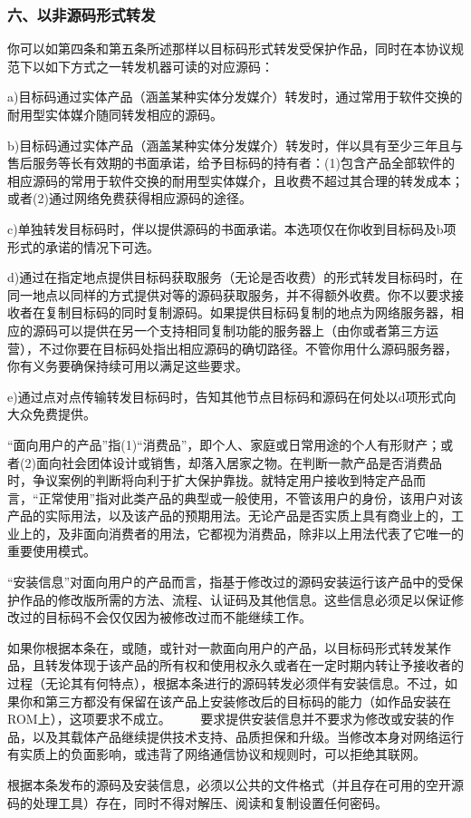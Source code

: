 \subsubsection{六、以非源码形式转发}
你可以如第四条和第五条所述那样以目标码形式转发受保护作品，同时在本协议规范下以如下方式之一转发机器可读的对应源码：\par
a)目标码通过实体产品（涵盖某种实体分发媒介）转发时，通过常用于软件交换的耐用型实体媒介随同转发相应的源码。\par
b)目标码通过实体产品（涵盖某种实体分发媒介）转发时，伴以具有至少三年且与售后服务等长有效期的书面承诺，给予目标码的持有者：(1)包含产品全部软件的相应源码的常用于软件交换的耐用型实体媒介，且收费不超过其合理的转发成本；或者(2)通过网络免费获得相应源码的途径。\par
c)单独转发目标码时，伴以提供源码的书面承诺。本选项仅在你收到目标码及b项形式的承诺的情况下可选。\par
d)通过在指定地点提供目标码获取服务（无论是否收费）的形式转发目标码时，在同一地点以同样的方式提供对等的源码获取服务，并不得额外收费。你不以要求接收者在复制目标码的同时复制源码。如果提供目标码复制的地点为网络服务器，相应的源码可以提供在另一个支持相同复制功能的服务器上（由你或者第三方运营），不过你要在目标码处指出相应源码的确切路径。不管你用什么源码服务器，你有义务要确保持续可用以满足这些要求。\par
e)通过点对点传输转发目标码时，告知其他节点目标码和源码在何处以d项形式向大众免费提供。\par
“面向用户的产品”指(1)“消费品”，即个人、家庭或日常用途的个人有形财产；或者(2)面向社会团体设计或销售，却落入居家之物。在判断一款产品是否消费品时，争议案例的判断将向利于扩大保护靠拢。就特定用户接收到特定产品而言，“正常使用”指对此类产品的典型或一般使用，不管该用户的身份，该用户对该产品的实际用法，以及该产品的预期用法。无论产品是否实质上具有商业上的，工业上的，及非面向消费者的用法，它都视为消费品，除非以上用法代表了它唯一的重要使用模式。\par
“安装信息”对面向用户的产品而言，指基于修改过的源码安装运行该产品中的受保护作品的修改版所需的方法、流程、认证码及其他信息。这些信息必须足以保证修改过的目标码不会仅仅因为被修改过而不能继续工作。\par
如果你根据本条在，或随，或针对一款面向用户的产品，以目标码形式转发某作品，且转发体现于该产品的所有权和使用权永久或者在一定时期内转让予接收者的过程（无论其有何特点），根据本条进行的源码转发必须伴有安装信息。不过，如果你和第三方都没有保留在该产品上安装修改后的目标码的能力（如作品安装在ROM上），这项要求不成立。 　　要求提供安装信息并不要求为修改或安装的作品，以及其载体产品继续提供技术支持、品质担保和升级。当修改本身对网络运行有实质上的负面影响，或违背了网络通信协议和规则时，可以拒绝其联网。\par
根据本条发布的源码及安装信息，必须以公共的文件格式（并且存在可用的空开源码的处理工具）存在，同时不得对解压、阅读和复制设置任何密码。
